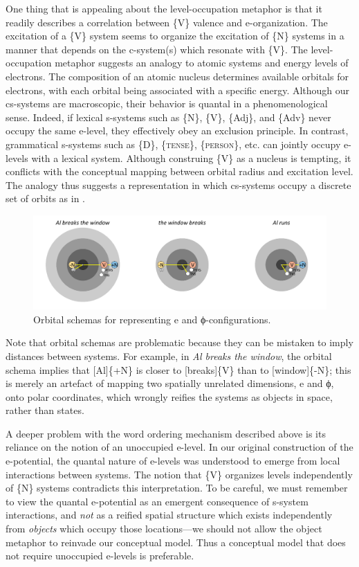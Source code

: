   One thing that is appealing about the level-occupation metaphor is that it readily describes a correlation between \{V\} valence and e-organization. The excitation of a \{V\} system seems to organize the excitation of \{N\} systems in a manner that depends on the c-system(s) which resonate with \{V\}. The level-occupation metaphor suggests an analogy to atomic systems and energy levels of electrons. The composition of an atomic nucleus determines available orbitals for electrons, with each orbital being associated with a specific energy. Although our cs-systems are macroscopic, their behavior is quantal in a phenomenological sense. Indeed, if lexical s-systems such as \{N\}, \{V\}, \{Adj\}, and \{Adv\} never occupy the same e-level, they effectively obey an exclusion principle. In contrast, grammatical s-systems such as \{D\}, \{\textsc{tense}\}, \{\textsc{person}\}, etc. can jointly occupy e-levels with a lexical system. Although construing \{V\} as a nucleus is tempting, it conflicts with the conceptual mapping between orbital radius and excitation level. The analogy thus suggests a representation in which cs-systems occupy a discrete set of orbits as in {}.

  
\begin{figure}
\includegraphics[width=\textwidth]{figures/Tilsen-img76.png}
\caption{Orbital schemas for representing e and ϕ-configurations.}
\label{fig:4:26}
\end{figure}
 

  Note that orbital schemas are problematic because they can be mistaken to imply distances between systems. For example, in \textit{Al breaks the window}, the orbital schema implies that [Al]\{+N\} is closer to [breaks]\{V\} than to [window]\{-N\}; this is merely an artefact of mapping two spatially unrelated dimensions, e and ϕ, onto polar coordinates, which wrongly reifies the systems as objects in space, rather than states.

  A deeper problem with the word ordering mechanism described above is its reliance on the notion of an unoccupied e-level. In our original construction of the e-potential, the quantal nature of e-levels was understood to emerge from local interactions between systems. The notion that \{V\} organizes levels independently of \{N\} systems contradicts this interpretation. To be careful, we must remember to view the quantal e-potential as an emergent consequence of s-system interactions, and \textit{not} as a reified spatial structure which exists independently from \textit{objects} which occupy those locations—we should not allow the object metaphor to reinvade our conceptual model. Thus a conceptual model that does not require unoccupied e-levels is preferable.

